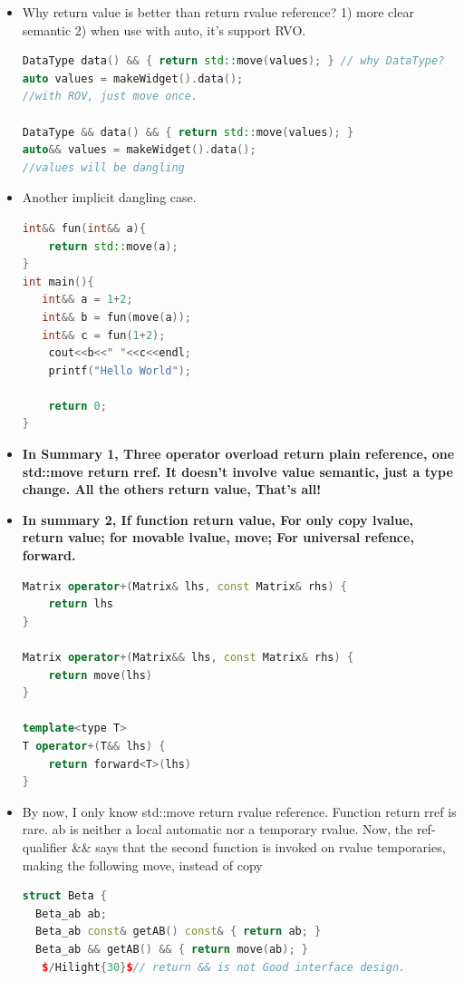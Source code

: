 \documentclass[a4paper,12pt,twoside]{book}
\begin{document}
\begin{itemize}
\item Why return value is better than return rvalue reference? 1) more clear semantic 2) when use with auto, it's support RVO. 
\begin{lstlisting}[frame=single, language=c++]
DataType data() && { return std::move(values); } // why DataType?
auto values = makeWidget().data();
//with ROV, just move once. 

DataType && data() && { return std::move(values); }
auto&& values = makeWidget().data();
//values will be dangling
\end{lstlisting}

\item Another implicit dangling case. 
\begin{lstlisting}[frame=single, language=c++]
int&& fun(int&& a){
    return std::move(a);
}
int main(){
   int&& a = 1+2;
   int&& b = fun(move(a));
   int&& c = fun(1+2);
    cout<<b<<" "<<c<<endl;
    printf("Hello World");

    return 0;
}
\end{lstlisting}



\item \textbf{In Summary 1, Three operator overload return plain reference, one std::move return rref. It doesn't involve value semantic, just a type change. All the others return value, That's all!}

\item \textbf{In summary 2, If function return value, For only copy lvalue, return value; for movable lvalue, move;  For universal refence, forward. }

\begin{lstlisting}[frame=single, language=c++]
Matrix operator+(Matrix& lhs, const Matrix& rhs) {
    return lhs
}

Matrix operator+(Matrix&& lhs, const Matrix& rhs) {
    return move(lhs)
}

template<type T>
T operator+(T&& lhs) {
    return forward<T>(lhs)
}
\end{lstlisting}

\item By now, I only know std::move return rvalue reference.  Function return rref is rare. ab is neither a local automatic nor a temporary rvalue. Now, the ref-qualifier \&\& says that the second function is invoked on rvalue temporaries, making the following move, instead of copy

\begin{lstlisting}[frame=single, language=c++]
struct Beta {
  Beta_ab ab;
  Beta_ab const& getAB() const& { return ab; }
  Beta_ab && getAB() && { return move(ab); }
   $/Hilight{30}$// return && is not Good interface design.


\end{lstlisting}
\end{itemize}
\end{document}
